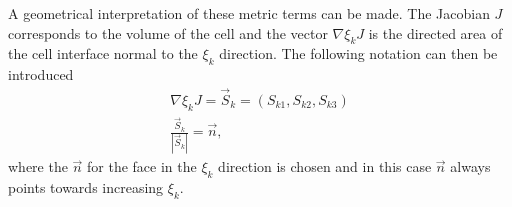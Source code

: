 A geometrical interpretation of these metric terms can be made. The Jacobian $J$ corresponds to the volume of the cell and the vector $\nabla \xi_k J$ is the directed area of the cell interface normal to the $\xi_k$ direction. The following notation can then be introduced
\begin{gather*}
    \nabla \xi_k J = \vec{S}_k = (S_{k1}, S_{k2}, S_{k3}) \\
    \frac{\vec{S}_k}{|\vec{S}_k|}= \vec{n},
\end{gather*}
where the $\vec{n}$ for the face in the $\xi_k$ direction is chosen and in this case $\vec{n}$ always points towards increasing $\xi_k$.


